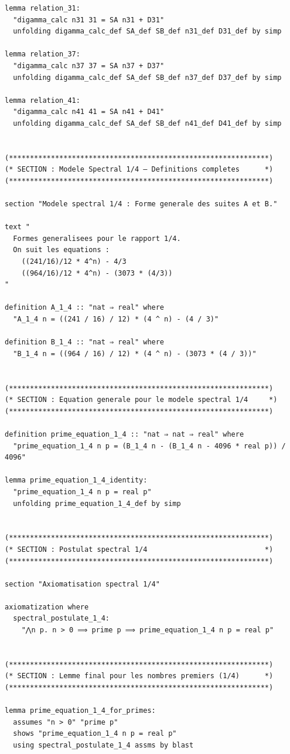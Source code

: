 \documentclass[a4paper,11pt]{article}
\begin{document}
\begin{holcode}[title={\textcolor{white}{File: methode\_spectral.thy -- Part 2/4}}]
\begin{lstlisting}
lemma relation_31:
  "digamma_calc n31 31 = SA n31 + D31"
  unfolding digamma_calc_def SA_def SB_def n31_def D31_def by simp

lemma relation_37:
  "digamma_calc n37 37 = SA n37 + D37"
  unfolding digamma_calc_def SA_def SB_def n37_def D37_def by simp

lemma relation_41:
  "digamma_calc n41 41 = SA n41 + D41"
  unfolding digamma_calc_def SA_def SB_def n41_def D41_def by simp


(**************************************************************)
(* SECTION : Modele Spectral 1/4 – Definitions completes      *)
(**************************************************************)

section "Modele spectral 1/4 : Forme generale des suites A et B."

text "
  Formes generalisees pour le rapport 1/4.
  On suit les equations :
    ((241/16)/12 * 4^n) - 4/3
    ((964/16)/12 * 4^n) - (3073 * (4/3))
"

definition A_1_4 :: "nat ⇒ real" where
  "A_1_4 n = ((241 / 16) / 12) * (4 ^ n) - (4 / 3)"

definition B_1_4 :: "nat ⇒ real" where
  "B_1_4 n = ((964 / 16) / 12) * (4 ^ n) - (3073 * (4 / 3))"


(**************************************************************)
(* SECTION : Equation generale pour le modele spectral 1/4     *)
(**************************************************************)

definition prime_equation_1_4 :: "nat ⇒ nat ⇒ real" where
  "prime_equation_1_4 n p = (B_1_4 n - (B_1_4 n - 4096 * real p)) / 4096"

lemma prime_equation_1_4_identity:
  "prime_equation_1_4 n p = real p"
  unfolding prime_equation_1_4_def by simp


(**************************************************************)
(* SECTION : Postulat spectral 1/4                            *)
(**************************************************************)

section "Axiomatisation spectral 1/4"

axiomatization where
  spectral_postulate_1_4:
    "⋀n p. n > 0 ⟹ prime p ⟹ prime_equation_1_4 n p = real p"


(**************************************************************)
(* SECTION : Lemme final pour les nombres premiers (1/4)      *)
(**************************************************************)

lemma prime_equation_1_4_for_primes:
  assumes "n > 0" "prime p"
  shows "prime_equation_1_4 n p = real p"
  using spectral_postulate_1_4 assms by blast



\end{lstlisting}
\end{holcode}
\end{document}
